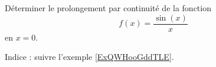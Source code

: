 
\begin{exercice}\label{exoanalyseCTU-0008}

    Déterminer le prolongement par continuité de la fonction
    \begin{equation}
        f(x)=\frac{ \sin(x) }{ x }
    \end{equation}
    en \( x=0\). 

    Indice : suivre l'exemple \ref{ExQWHooGddTLE}.

\end{exercice}
